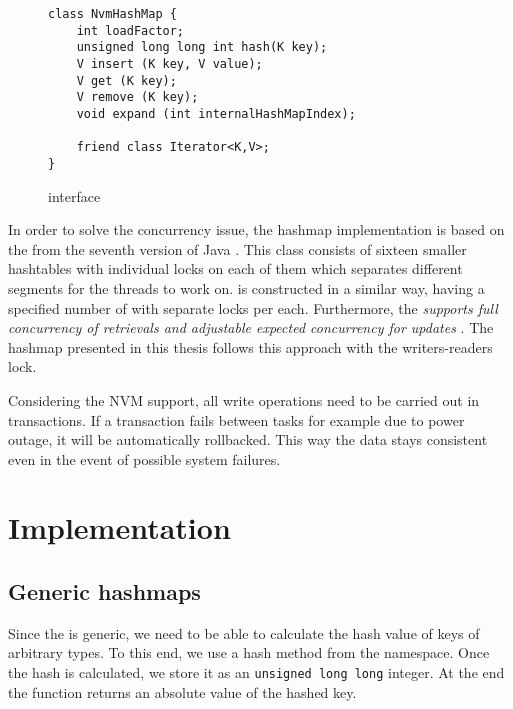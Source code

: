 \begin{figure}[ht] 
\renewcommand{\figurename}{Listing}
    \begin{lstlisting}
class NvmHashMap {
    int loadFactor;
    unsigned long long int hash(K key);
    V insert (K key, V value);
    V get (K key);
    V remove (K key);
    void expand (int internalHashMapIndex);
    
    friend class Iterator<K,V>;
}
    \end{lstlisting}
\label{NvmHashMap}
\caption{\NvmHashMap interface}
\end{figure}
    In order to solve the concurrency issue, the hashmap implementation is based on the \ConcurrentHashMap from the seventh version of Java \cite{ConcurrentHashMapJava}. 
    This class consists of sixteen smaller hashtables with individual locks on each of them which separates different segments for the threads to work on.
    \NvmHashMap is constructed in a similar way, having a specified number of \internalHashMaps with separate locks per each.
    Furthermore, the \ConcurrentHashMap \textit{supports full concurrency of retrievals and adjustable expected concurrency for updates} \cite{ConcurrentHashMapJava}. 
    The hashmap presented in this thesis follows this approach with the writers-readers lock.
    
    Considering the NVM support, all write operations need to be carried out in transactions. 
    If a transaction fails between tasks for example due to power outage, it will be automatically rollbacked.
    This way the data stays consistent even in the event of possible system failures.

\section{Implementation}

    \subsection{Generic hashmaps} 
        Since the \NvmHashMap is generic, we need to be able to calculate the hash value of keys of arbitrary types. 
        To this end, we use a hash method from the \std namespace. 
        Once the hash is calculated, we store it as an \texttt{unsigned long long} integer.
        At the end the function returns an absolute value of the hashed key.
        
